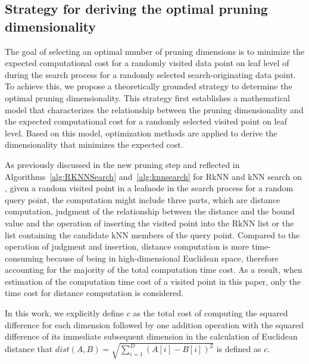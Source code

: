 \subsection{Strategy for deriving the optimal pruning dimensionality}

The goal of selecting an optimal number of pruning dimensions is to minimize the expected computational cost for a randomly visited data point on leaf level of \dualtree during the search process for a randomly selected search-originating data point. To achieve this, we propose a theoretically grounded strategy to determine the optimal pruning dimensionality. This strategy first establishes a mathematical model that characterizes the relationship between the pruning dimensionality and the expected computational cost for a randomly selected visited point on leaf level. Based on this model, optimization methods are applied to derive the dimensionality that minimizes the expected cost.





As previously discussed in the new pruning step and reflected in Algorithms~\ref{alg:RKNNSearch} and~\ref{alg:knnsearch} for RkNN and kNN search on \dualtree, given a random visited point in a leafnode in the search process for a random query point, the computation might include three parts, which are distance computation, judgment of the relationship between the distance and the bound value and the operation of inserting the visited point into the RkNN list or the list containing the candidate kNN members of the query point. Compared to the operation of judgment and insertion, distance computation is more time-consuming because of being in high-dimensional Euclidean space, therefore accounting for the majority of the total computation time cost. As a result, when estimation of the computation time cost of a visited point in this paper, only the time cost for distance computation is considered. 

\begin{definition}
In this work, we explicitly define $c$ as the total cost of computing the squared difference for each dimension followed by one addition operation with the squared difference of its immediate subsequent dimension in the calculation of Euclidean distance that $dist(A,B)=\sqrt{\sum^{D}_{i=1}(A[i]-B[i])^2}$ is defined as $c$.

\label{def: cost_unit}
\end{definition}


